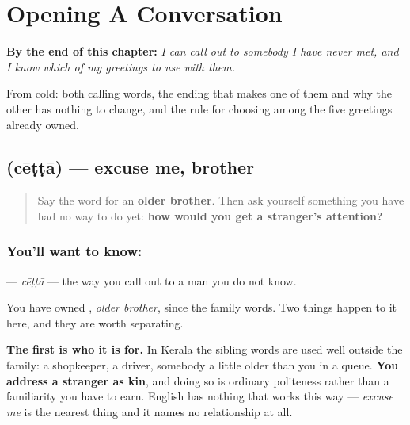 
\chapter{Opening A Conversation}
\label{ch:ml-address}

\begin{chapteropening}
\textbf{By the end of this chapter:} \emph{I can call out to somebody I have never met, and I know which of my greetings to use with them.}

From cold: both calling words, the ending that makes one of them and why the other has nothing to change, and the rule for choosing among the five greetings already owned.
\end{chapteropening}

\section[\texorpdfstring{\ml{ചേട്ടാ} (cēṭṭā)}{ചേട്ടാ (cēṭṭā)}]{ (cēṭṭā) — excuse me, brother}

\label{lesson:ML-C82-chettaa}



\begin{quote}
Say the word for an \textbf{older brother}. Then ask yourself something you have had no way to do yet: \textbf{how would you get a stranger's attention?}
\end{quote}

\subsection*{You'll want to know: }
\textbf{} — \emph{cēṭṭā} — the way you call out to a man you do not know.

You have owned \textbf{}, \emph{older brother}, since the family words. Two things happen to it here, and they are worth separating.

\textbf{The first is who it is for.} In Kerala the sibling words are used well outside the family: a shopkeeper, a driver, somebody a little older than you in a queue. \textbf{You address a stranger as kin}, and doing so is ordinary politeness rather than a familiarity you have to earn. English has nothing that works this way — \emph{excuse me} is the nearest thing and it names no relationship at all.

